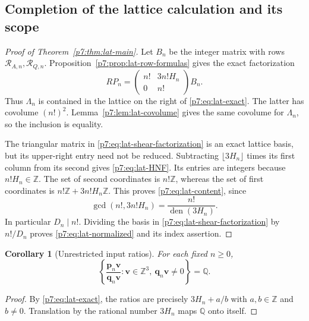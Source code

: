 \documentclass[11pt,a4paper]{article}
\newtheorem{corollary}[theorem]{Corollary}
\theoremstyle{definition}
\theoremstyle{remark}
\newcommand{\Q}{\mathbb Q}
\newcommand{\Z}{\mathbb Z}
\DeclareMathOperator{\den}{den}
\numberwithin{equation}{section}
\begin{document}
\subsection{Completion of the lattice calculation and its scope}

\begin{proof}[Proof of Theorem~\ref{p7:thm:lat-main}]
Let $B_n$ be the integer matrix with rows
$\mathcal R_{A,n},\mathcal R_{Q,n}$.  Proposition~\ref{p7:prop:lat-row-formulas}
gives the exact factorization
\begin{equation}\label{p7:eq:lat-shear-factorization}
RP_n=
\begin{pmatrix}n!&3n!H_n\\0&n!\end{pmatrix}B_n.
\end{equation}
Thus $\Lambda_n$ is contained in the lattice on the right of
\eqref{p7:eq:lat-exact}.  The latter has covolume $(n!)^2$.
Lemma~\ref{p7:lem:lat-covolume} gives the same covolume for $\Lambda_n$,
so the inclusion is equality.

The triangular matrix in \eqref{p7:eq:lat-shear-factorization} is an exact
lattice basis, but its upper-right entry need not be reduced.  Subtracting
$\lfloor3H_n\rfloor$ times its first column from its second gives
\eqref{p7:eq:lat-HNF}.  Its entries are integers because $n!H_n\in\Z$.
The set of second coordinates is $n!\Z$, whereas the set of first
coordinates is $n!\Z+3n!H_n\Z$.  This proves
\eqref{p7:eq:lat-content}, since
\[
\gcd(n!,3n!H_n)=\frac{n!}{\den(3H_n)}.
\]
In particular $D_n\mid n!$.  Dividing the basis in
\eqref{p7:eq:lat-shear-factorization} by $n!/D_n$ proves
\eqref{p7:eq:lat-normalized} and its index assertion.
\end{proof}

\begin{corollary}[Unrestricted input ratios]\label{p7:cor:lat-all-rationals}
For each fixed $n\geq0$,
\[
\left\{\frac{\mathbf p_n\mathbf v}{\mathbf q_n\mathbf v}:
 \mathbf v\in\Z^3,\ \mathbf q_n\mathbf v\ne0\right\}=\Q.
\]
\end{corollary}

\begin{proof}
By \eqref{p7:eq:lat-exact}, the ratios are precisely
$3H_n+a/b$ with $a,b\in\Z$ and $b\ne0$.  Translation by the rational
number $3H_n$ maps $\Q$ onto itself.
\end{proof}
\end{document}
